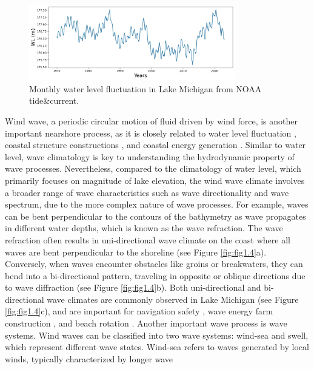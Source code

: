 \begin{figure}[htbp]
  \centering
  \includegraphics[width=0.8\textwidth]{chapter1/resources/figure1-3.jpg}
  \caption{Monthly water level fluctuation in Lake Michigan from NOAA tide\&current.}
  \label{fig:fig1.3}
\end{figure}

Wind wave, a periodic circular motion of fluid driven by wind force, is another
important nearshore process, as it is closely related to water level fluctuation
\citep{meadows_relationship_1997,huang_impacts_2021,huang_wave_2021}, coastal
structure constructions \citep{karambas_modelling_2015}, and coastal energy
generation \citep{ching-piao_study_2012}. Similar to water level, wave
climatology is key to understanding the hydrodynamic property of wave processes.
Nevertheless, compared to the climatology of water level, which primarily
focuses on magnitude of lake elevation, the wind wave climate involves a broader
range of wave characteristics such as wave directionality and wave spectrum, due
to the more complex nature of wave processes. For example, waves can be bent
perpendicular to the contours of the bathymetry as wave propagates in different
water depths, which is known as the wave refraction. The wave refraction often
results in uni-directional wave climate on the coast where all waves are bent
perpendicular to the shoreline (see Figure \ref{fig:fig1.4}a). Conversely, when
waves encounter obstacles like groins or breakwaters, they can bend into a
bi-directional pattern, traveling in opposite or oblique directions due to wave
diffraction (see Figure \ref{fig:fig1.4}b). Both uni-directional and
bi-directional wave climates are commonly observed in Lake Michigan (see Figure
\ref{fig:fig1.4}c), and are important for navigation safety
\citep{zimmermann_longshore_2012}, wave energy farm construction
\citep{lopez-ruiz_importance_2016,bertram_systematic_2020}, and beach rotation
\citep{wiggins_coastal_2019,wiggins_regionally-coherent_2019}. Another important
wave process is wave systems. Wind waves can be classified into two wave
systems: wind-sea and swell, which represent different wave states. Wind-sea
refers to waves generated by local winds, typically characterized by longer wave
